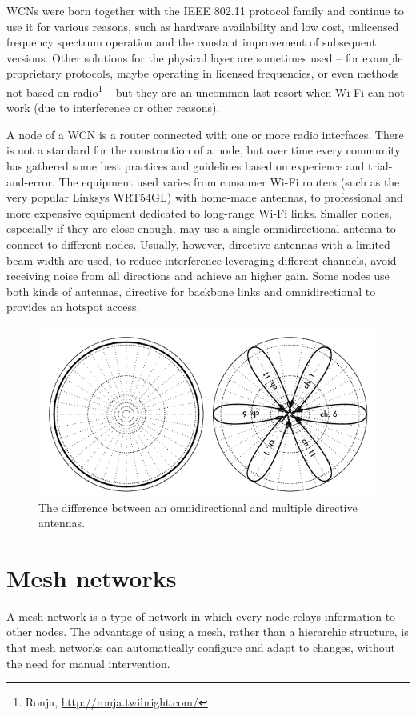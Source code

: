 \documentclass[a4paper,11pt,twoside,openleft]{memoir}
\begin{document}
WCNs were born together with the IEEE 802.11 protocol family and
continue to use it for various reasons, such as hardware availability
and low cost, unlicensed frequency spectrum operation and the constant
improvement of subsequent versions. Other solutions for the physical
layer are sometimes used -- for example proprietary protocols, maybe
operating in licensed frequencies, or even methods not based on
radio\footnote{Ronja, \url{http://ronja.twibright.com/}} -- but they are
an uncommon last resort when Wi-Fi can not work (due to interference or
other reasons).

A node of a WCN is a router connected with one or more radio interfaces.
There is not a standard for the construction of a node, but over time
every community has gathered some best practices and guidelines based on
experience and trial-and-error. The equipment used varies from consumer
Wi-Fi routers (such as the very popular Linksys WRT54GL) with home-made
antennas, to professional and more expensive equipment dedicated to
long-range Wi-Fi links. Smaller nodes, especially if they are close enough,
may use a single omnidirectional antenna to connect to
different nodes. Usually, however, directive antennas with a limited
beam width are used, to reduce interference leveraging different
channels, avoid receiving noise from all directions and achieve an
higher gain. Some nodes use both kinds of antennas, directive for
backbone links and omnidirectional to provides an hotspot access.

\begin{figure}[htbp]
\centering
\includegraphics{./images/directional-antennas.png}
\caption{The difference between an omnidirectional and multiple
directive antennas.}
\end{figure}

\section{Mesh networks}\label{mesh-networks}
A mesh network is a type of network in which every node relays information
to other nodes. The advantage of using a mesh, rather than a
hierarchic structure, is that mesh networks can automatically configure
and adapt to changes, without the need for manual intervention.
\end{document}
